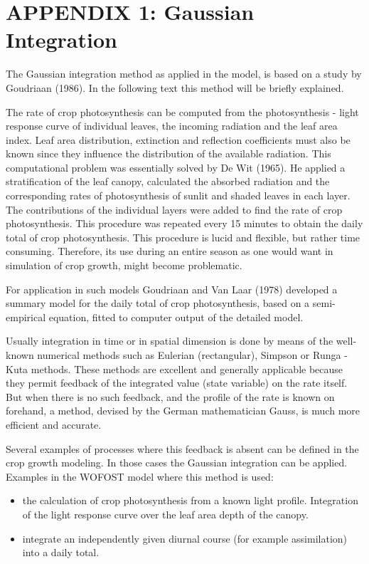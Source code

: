 \chapter{APPENDIX 1: Gaussian Integration}


The Gaussian integration method as applied in the model, is based on a study by Goudriaan
(1986). In the following text this method will be briefly explained.

The rate of crop photosynthesis can be computed from the photosynthesis - light response
curve of individual leaves, the incoming radiation and the leaf area index. Leaf area
distribution, extinction and reflection coefficients must also be known since they influence
the distribution of the available radiation. This computational problem was essentially solved
by De Wit (1965). He applied a stratification of the leaf canopy, calculated the absorbed
radiation and the corresponding rates of photosynthesis of sunlit and shaded leaves in each
layer. The contributions of the individual layers  were added to find the rate of crop
photosynthesis. This procedure was repeated every 15 minutes to obtain the daily total of
crop photosynthesis. This procedure is lucid and flexible, but rather time consuming.
Therefore, its use during an entire season as one would want in simulation of crop growth,
might become problematic.

For application in such models Goudriaan and Van Laar (1978) developed a summary model
for the daily total of crop photosynthesis, based on a semi-empirical equation, fitted to
computer output of the detailed model.

Usually integration in time or in spatial dimension is done by means of the well-known
numerical methods such as Eulerian (rectangular), Simpson or Runga - Kuta methods. These
methods are excellent and generally applicable because they permit feedback of the
integrated value (state variable) on the rate itself. But when there is no such feedback, and
the profile of the rate is known on forehand, a method, devised by the German
mathematician Gauss, is much more efficient and accurate. 

Several examples of processes where this feedback is absent can be defined in the crop
growth modeling. In those cases the Gaussian integration can be applied. Examples in the
WOFOST model where this method is used:
\begin{itemize}
\item the calculation of crop photosynthesis from a known light profile. Integration
    of the light response curve over the leaf area depth of the canopy. 
\item integrate an independently given diurnal course (for example assimilation) into
    a daily total.
\end{itemize}


